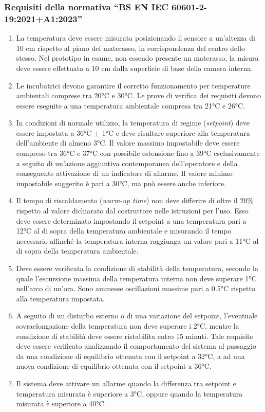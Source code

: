 \subsubsection{Requisiti della normativa ``BS EN IEC 60601-2-19:2021+A1:2023''}
\begin{enumerate}
	\item La temperatura deve essere misurata posizionando il sensore a un'altezza di 10 cm rispetto al piano del materasso,
	in corrispondenza del centro dello stesso. Nel prototipo in esame, non essendo presente un materasso, la misura deve
	essere effettuata a 10 cm dalla superficie di base della camera interna.

	\item Le incubatrici devono garantire il corretto funzionamento per temperature ambientali comprese tra 20°C e 30°C.
	Le prove di verifica dei requisiti devono essere eseguite a una temperatura ambientale compresa tra 21°C e 26°C.

	\item In condizioni di normale utilizzo, la temperatura di regime (\textit{setpoint}) deve essere impostata a 36°C \(\pm\)
	1°C e deve risultare superiore alla temperatura dell'ambiente di almeno 3°C. Il valore massimo impostabile deve essere
	compreso tra 36°C e 37°C con possibile estensione fino a 39°C esclusivamente a seguito di un'azione aggiuntiva contemporanea
	dell'operatore e della conseguente attivazione di un indicatore di allarme. Il valore minimo impostabile suggerito
	è pari a 30°C, ma può essere anche inferiore.

	\item Il tempo di riscaldamento (\textit{warm-up time}) non deve differire di oltre il 20\% rispetto al valore dichiarato
	dal costruttore nelle istruzioni per l'uso. Esso deve essere determinato impostando il setpoint a una temperatura pari
	a 12°C al di sopra della temperatura ambientale e misurando il tempo necessario affinché la temperatura interna raggiunga
	un valore pari a 11°C al di sopra della temperatura ambientale.

	\item Deve essere verificata la condizione di stabilità della temperatura, secondo la quale l'escursione massima della
	temperatura interna non deve superare 1°C nell'arco di un'ora. Sono ammesse oscillazioni massime pari a 0.5°C rispetto
	alla temperatura impostata.

	\item A seguito di un disturbo esterno o di una variazione del setpoint, l'eventuale sovraelongazione della temperatura
	non deve superare i 2°C, mentre la condizione di stabilità deve essere ristabilita entro 15 minuti. Tale requisito deve
	essere verificato analizzando il comportamento del sistema al passaggio da una condizione di equilibrio ottenuta con
	il setpoint a 32°C, a ad una nuova condizione di equilibrio ottenuta con il setpoint a 36°C.

	\item Il sistema deve attivare un allarme quando la differenza tra setpoint e temperatura misurata è superiore a 3°C,
	oppure quando la temperatura misurata è superiore a 40°C.
\end{enumerate}

